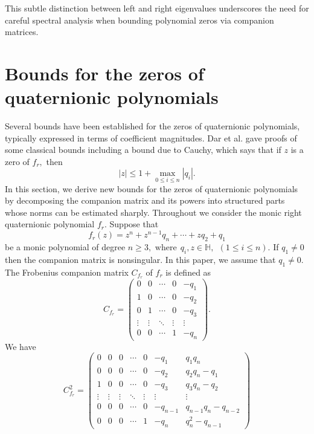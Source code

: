 \documentclass [12pt]{article}
\begin{document}
This subtle distinction between left and right eigenvalues underscores the need for careful spectral analysis when bounding polynomial zeros via companion matrices. 










\section{ Bounds for the zeros of quaternionic polynomials}
Several bounds have been established for the zeros of quaternionic polynomials, typically expressed in terms of coefficient magnitudes. Dar et al. \cite{DR} gave proofs of some classical bounds including a bound due to Cauchy, which says that if $z$ is a zero of $f_{r},$ then \\
$$|z|\le 1+ \max_{0\le i \le n}|q_{i}|.$$
In this section, we derive  new bounds for the zeros of quaternionic polynomials by decomposing the companion matrix and its powers into structured parts whose norms can be estimated sharply. Throughout we consider the monic right quaternionic polynomial $f_r$. Suppose that
$$f_r(z) = z^n  + z^{n-1} q_{n} + \cdots + zq_{2}+q_{1}  
$$ be a monic polynomial of degree $n\ge 3,$ $\mbox{where}~~ q_{i}, z \in\mathbb{H},~~(1 \le i \le n)$. If $ q_{1}\ne 0$ then the companion matrix is nonsingular. In this paper, we assume that $q_{1}\ne 0.$
\\ The Frobenius companion matrix $C_{f_{r}}$ of $f_{r}$ is defined as\\
\[
C_{f_r} = 
\begin{pmatrix}
0 & 0 & \cdots & 0 & -q_{1} \\
1 & 0 & \cdots & 0 & -q_{2} \\
0 & 1 & \cdots & 0 & -q_{3} \\
\vdots & \vdots & \ddots & \vdots & \vdots \\
0 & 0 & \cdots & 1 & -q_{n}
\end{pmatrix}.
\]
We have
\[
C^{2}_{f_{r}} = 
\begin{pmatrix}
0 & 0 & 0 & \cdots &0& -q_{1}&q_{1}q_{n} \\
0 & 0 & 0 & \cdots &0& -q_{2} &q_{2}q_{n}-q_{1}\\
1 & 0 & 0 & \cdots &0& -q_{3} &q_{3}q_{n}-q_{2}\\
\vdots & \vdots & \vdots & \ddots & \vdots& \vdots&\vdots \\
0 & 0 & 0 & \cdots &0 & -q_{n-1} &q_{n-1}q_{n}-q_{n-2}\\
0 & 0 & 0 & \cdots &1 & -q_{n} & q^{2}_{n}-q_{n-1}
\end{pmatrix}
\] 
\end{document}
